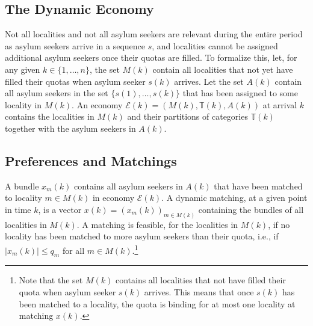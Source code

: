 \documentclass[12pt,fleqn]{article}
\begin{document}
\subsection{The Dynamic Economy}
Not all localities and not all asylum seekers are relevant during the entire period as asylum seekers arrive in a sequence $s$, and localities cannot be assigned additional asylum seekers once their quotas are filled. To formalize this, let, for any given $k\in \{1,\ldots,n\}$, the set $M(k)$ contain all localities that not yet have filled their quotas when asylum seeker $s(k)$ arrives. Let the set $A(k)$ contain all asylum seekers in the set $\{s(1),\ldots,s(k)\}$ that has been assigned to some locality in $M(k)$. An economy $\mathcal{E}(k)=(M(k),\mathbb{T}(k),A(k))$ at arrival $k$ contains the localities in $M(k)$ and their partitions of categories $\mathbb{T}(k)$ together with the asylum seekers in $A(k)$.

\subsection{Preferences and Matchings}
A bundle $x_m(k)$ contains all asylum seekers in $A(k)$ that have been matched to locality $m\in M(k)$ in economy $\mathcal{E}(k)$. A dynamic matching, at a given point in time $k$, is a vector $x(k)=(x_m(k))_{m\in M(k)}$ containing the bundles of all localities in $M(k)$. A matching is feasible, for the localities in $M(k)$, if no locality has been matched to more asylum seekers than their quota, i.e., if $|x_m(k)|\leq q_m$ for all $m\in M(k)$.\footnote{Note that the set $M(k)$ contains all localities that not have filled their quota when asylum seeker $s(k)$ arrives. This means that once $s(k)$ has been matched to a locality, the quota is binding for at most one locality at matching $x(k)$.}
\end{document}

